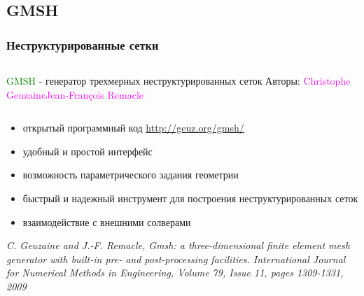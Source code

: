 \documentclass[ucs]{beamer}
\begin{document}
\subsection{GMSH}
\begin{frame}
	\frametitle{Неструктурированные сетки}
	\begin{columns}
		{\Large \textcolor{green}{GMSH} - генератор трехмерных неструктурированных сеток} 
		\newline Авторы: \textcolor{magenta}{Christophe Geuzaine\newline Jean-François Remacle\newline} 
	\end{columns}
	\begin{itemize}
	\item открытый программный код \url{http://geuz.org/gmsh/}
	\item удобный и простой интерфейс
	\item возможность параметрического задания геометрии
	\item быстрый и надежный инструмент для построения неструктурированных сеток
	\item взаимодействие с внешними солверами 
	\end{itemize}
	\textit{C. Geuzaine and J.-F. Remacle, Gmsh: a three-dimensional finite element mesh generator with built-in pre- and post-processing facilities. International Journal for Numerical Methods in Engineering, Volume 79, Issue 11, pages 1309-1331, 2009}
\end{frame}
\end{document}
